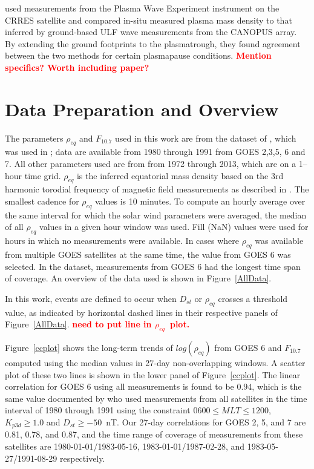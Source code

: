 \documentclass[10pt,twocolumn]{article}
\newcommand{\vinote}[1]{\textcolor{red}{\textbf{#1}}} %
\newcommand{\req}{\ensuremath{\rho_{eq}}}
\newcommand{\inote}[1]{\textcolor{blue}{\textbf{#1}}} %
\def\note#1\par{\textcolor{blue}{\textbf{#1}}\\}
\begin{document}
\cite{Lotoaniu1999PlasmaMassDensity} used measurements from the Plasma Wave Experiment instrument on the CRRES satellite and compared in-situ measured plasma mass density to that inferred by ground-based ULF wave measurements from the CANOPUS array. By extending the ground footprints to the plasmatrough, they found agreement between the two methods for certain plasmapause conditions.  \vinote{Mention specifics? Worth including paper?}


\section{Data Preparation and Overview}

The parameters $\rho_{eq}$ and $F_{10.7}$ used in this work are from the dataset of \cite{Denton}, which was used in \cite{Takahashi2010}; data are available from 1980 through 1991 from GOES 2,3,5, 6 and 7.  All other parameters used are from \cite{Kondrashov2014ReconstructionOfGaps} from 1972 through 2013, which are on a 1--hour time grid. $\rho_{eq}$ is the inferred equatorial mass density based on the 3rd harmonic torodial frequency of magnetic field measurements as described in \cite{Takahashi2010}.  The smallest cadence for $\rho_{eq}$ values is 10 minutes.  To compute an hourly average over the same interval for which the solar wind parameters were averaged, the median of all $\rho_{eq}$ values in a given hour window was used.  Fill (NaN) values were used for hours in which no measurements were available.  In cases where $\rho_{eq}$ was available from multiple GOES satellites at the same time, the value from GOES 6 was selected.  In the dataset, measurements from GOES 6 had the longest time span of coverage.  An overview of the data used is shown in Figure~\ref{AllData}.

In this work, events are defined to occur when $D_{st}$ or $\rho_{eq}$ crosses a threshold value, as indicated by horizontal dashed lines in their respective panels of Figure~\ref{AllData}.  \vinote{need to put line in \req\ plot.}

Figure~\ref{ccplot} shows the long-term trends of $log(\rho_{eq})$ from GOES 6 and $F_{10.7}$ computed using the median values in 27-day non-overlapping windows.  A scatter plot of these two lines is shown in the lower panel of Figure~\ref{ccplot}.  The linear correlation for GOES 6 using all measurements is found to be $0.94$, which is the same value documented by \cite{Takahashi2010} who used measurements from all satellites in the time interval of 1980 through 1991 using the constraint $0600 \leq MLT \le 1200$, $K_{p3d}\ge1.0$ and $D_{st}\ge -50$~nT.  Our 27-day correlations for GOES 2, 5, and 7 are 0.81, 0.78, and 0.87, and the time range of coverage of measurements from these satellites are 1980-01-01/1983-05-16, 1983-01-01/1987-02-28, and 1983-05-27/1991-08-29 respectively.
\end{document}
